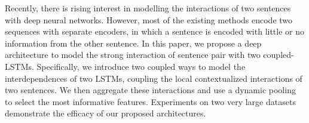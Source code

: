 Recently, there is rising interest in modelling the interactions of two sentences with deep neural networks. However, most of the existing methods encode two sequences with separate encoders, in which a sentence is encoded with little or no information from the other sentence. In this paper, we propose a deep architecture to model the strong  interaction of sentence pair with two coupled-LSTMs. Specifically, we introduce two coupled ways to model the interdependences of two LSTMs, coupling the local contextualized interactions of two sentences. We then aggregate these interactions and use a dynamic pooling to select the most informative features. Experiments on two very large datasets demonstrate the efficacy of our proposed architectures.
